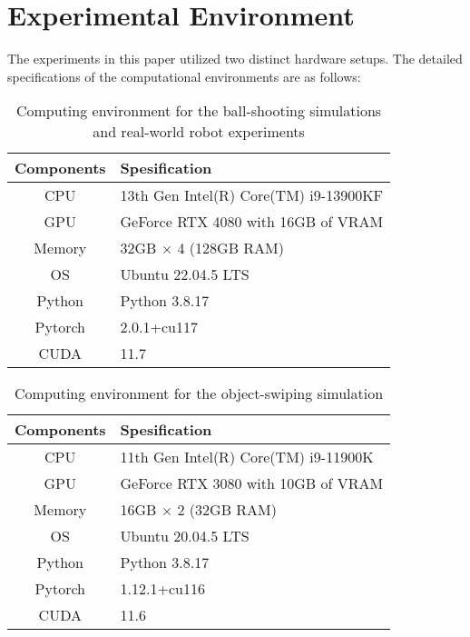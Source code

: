 \documentclass[sn-mathphys-num]{sn-jnl}
\begin{document}
\section{Experimental Environment}\label{appendix:computational:settings}
The experiments in this paper utilized two distinct hardware setups.
The detailed specifications of the computational environments are as follows:


\begin{table}[h]
    \centering
    \caption{Computing environment for the ball-shooting simulations and real-world robot experiments}
    \label{tab:time:cost}
    \begin{tabular}{|c||l|} \hline
        Components & Spesification \\ \hline \hline
        CPU        & 13th Gen Intel(R) Core(TM) i9-13900KF \\
        GPU        & GeForce RTX 4080 with 16GB of VRAM  \\
        Memory     & 32GB $\times$ 4 (128GB RAM)  \\
        OS         & Ubuntu 22.04.5 LTS  \\
        Python     & Python 3.8.17  \\
        Pytorch    & 2.0.1+cu117  \\
        CUDA       & 11.7 \\
        \hline
    \end{tabular}
\end{table}


\begin{table}[h]
    \centering
    \caption{Computing environment for the object-swiping simulation}
    \label{tab:time:cost}
    \begin{tabular}{|c||l|} \hline
        Components & Spesification \\ \hline \hline
        CPU        & 11th Gen Intel(R) Core(TM) i9-11900K  \\
        GPU        & GeForce RTX 3080 with 10GB of VRAM  \\
        Memory     & 16GB $\times$ 2 (32GB RAM) \\
        OS         & Ubuntu 20.04.5 LTS  \\
        Python     & Python 3.8.17  \\
        Pytorch    & 1.12.1+cu116  \\
        CUDA       & 11.6  \\
        \hline
    \end{tabular}
\end{table}
\end{document}
